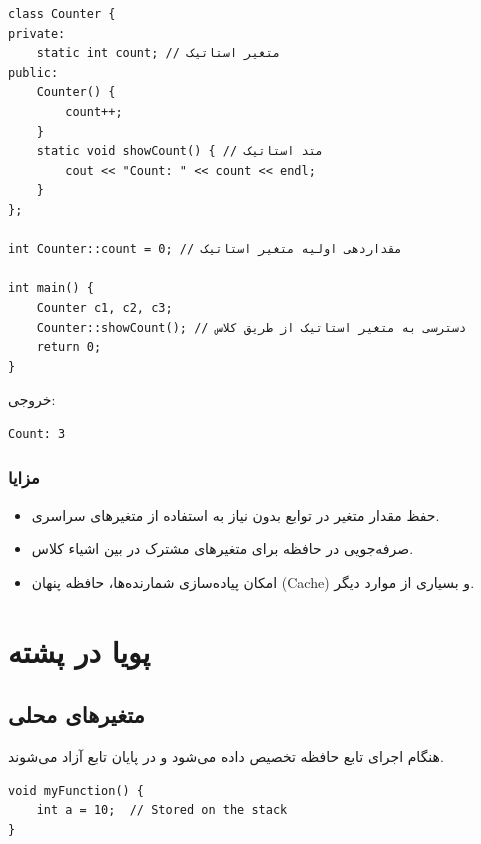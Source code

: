 \documentclass{article}
\begin{document}
\begin{LTR} %
\begin{lstlisting}
class Counter {
private:
    static int count; // متغیر استاتیک
public:
    Counter() {
        count++;
    }
    static void showCount() { // متد استاتیک
        cout << "Count: " << count << endl;
    }
};

int Counter::count = 0; // مقداردهی اولیه متغیر استاتیک

int main() {
    Counter c1, c2, c3;
    Counter::showCount(); // دسترسی به متغیر استاتیک از طریق کلاس
    return 0;
}
\end{lstlisting}
\end{LTR}

خروجی:

\begin{LTR} %
\begin{lstlisting}
Count: 3
\end{lstlisting}
\end{LTR}

\subsubsection*{مزایا}
\begin{itemize}
    \item حفظ مقدار متغیر در توابع بدون نیاز به استفاده از متغیرهای سراسری.
    \item صرفه‌جویی در حافظه برای متغیرهای مشترک در بین اشیاء کلاس.
    \item امکان پیاده‌سازی شمارنده‌ها، حافظه پنهان (Cache) و بسیاری از موارد دیگر.
\end{itemize}


\section*{پویا در پشته}

\subsection*{متغیر‌های محلی}
هنگام اجرای تابع حافظه تخصیص داده می‌شود و در پایان تابع آزاد می‌‌شوند.



\begin{LTR} %
\begin{lstlisting}
void myFunction() {
    int a = 10;  // Stored on the stack
}
\end{lstlisting}
\end{LTR}
\end{document}
